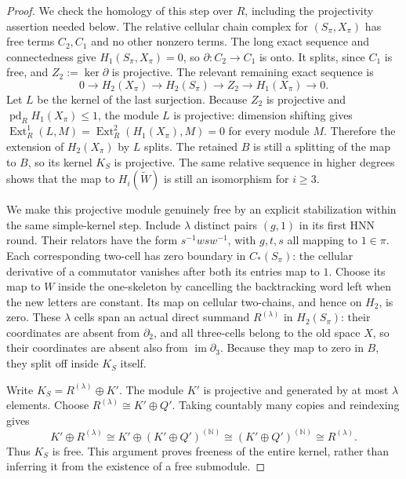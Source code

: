 \begin{proof}
We check the homology of this step over $R$, including the
projectivity assertion needed below. The relative cellular chain
complex for $(S_\pi,X_\pi)$ has free terms $C_2,C_1$ and no
other nonzero terms. The long exact sequence and connectedness
give $H_1(S_\pi,X_\pi)=0$, so $\partial:C_2\to C_1$ is onto.
It splits, since $C_1$ is free, and
$Z_2:=\ker\partial$ is projective. The relevant remaining exact
sequence is
\[
 0\longrightarrow H_2(X_\pi)\longrightarrow H_2(S_\pi)
 \longrightarrow Z_2\longrightarrow H_1(X_\pi)
 \longrightarrow0.
 \tag{A.16.2}
\]
Let $L$ be the kernel of the last surjection. Because $Z_2$ is
projective and $\operatorname{pd}_R H_1(X_\pi)\leq1$, the module
$L$ is projective: dimension shifting gives
$\operatorname{Ext}^1_R(L,M)=\operatorname{Ext}^2_R(H_1(X_\pi),M)=0$
for every module $M$. Therefore the extension of $H_2(X_\pi)$ by
$L$ splits. The retained $B$ is still a splitting of the map to
$B$, so its kernel $K_S$ is projective. The same relative sequence
in higher degrees shows that the map to $H_i(\widetilde W)$ is
still an isomorphism for $i\geq3$.

We make this projective module genuinely free by an explicit
stabilization within the same simple-kernel step. Include
$\lambda$ distinct pairs $(g,1)$ in its first HNN round.
Their relators have the form $s^{-1}wsw^{-1}$, with $g,t,s$ all
mapping to $1\in\pi$. Each corresponding two-cell has zero
boundary in $C_*(S_\pi)$: the cellular derivative of a commutator
vanishes after both its entries map to $1$. Choose its map to $W$
inside the one-skeleton by cancelling the backtracking word left
when the new letters are constant. Its map on cellular two-chains,
and hence on $H_2$, is zero. These $\lambda$ cells span an actual
direct summand $R^{(\lambda)}$ in $H_2(S_\pi)$: their coordinates
are absent from $\partial_2$, and all three-cells belong to the
old space $X$, so their coordinates are absent also from
$\operatorname{im}\partial_3$. Because they map to zero in $B$,
they split off inside $K_S$ itself.

Write $K_S=R^{(\lambda)}\oplus K'$. The module $K'$ is projective
and generated by at most $\lambda$ elements. Choose
$R^{(\lambda)}\cong K'\oplus Q'$. Taking countably many copies
and reindexing gives
\[
 K'\oplus R^{(\lambda)}
 \cong K'\oplus(K'\oplus Q')^{(\mathbb N)}
 \cong(K'\oplus Q')^{(\mathbb N)}
 \cong R^{(\lambda)}.
\]
Thus $K_S$ is free. This argument proves freeness of the entire
kernel, rather than inferring it from the existence of a free
submodule.


\end{proof}
